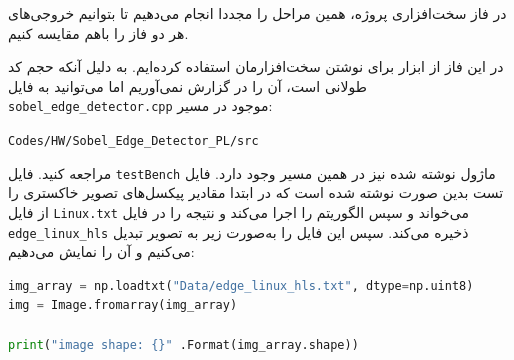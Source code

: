 \begin{qsolve}
	در فاز سخت‌افزاری پروژه، همین مراحل را مجددا انجام می‌دهیم تا بتوانیم خروجی‌های هر دو فاز را باهم مقایسه کنیم. 
	
	در این فاز از ابزار  برای نوشتن سخت‌افزارمان استفاده کرده‌ایم. به دلیل آنکه حجم کد طولانی است، آن را در گزارش نمی‌آوریم اما می‌توانید به فایل \texttt{sobel\_edge\_detector.cpp} موجود در مسیر:
	
	\begin{latin}
		\texttt{Codes/HW/Sobel\_Edge\_Detector\_PL/src}
	\end{latin}
	
	مراجعه کنید. فایل \texttt{testBench} ماژول نوشته شده نیز در همین مسیر وجود دارد. فایل تست بدین صورت نوشته شده است که در ابتدا مقادیر پیکسل‌های تصویر خاکستری را از فایل \texttt{Linux.txt} می‌خواند و سپس الگوریتم را اجرا می‌کند و نتیجه را در فایل \texttt{edge\_linux\_hls} ذخیره می‌کند. سپس این فایل را به‌صورت زیر به تصویر تبدیل می‌کنیم و آن را نمایش می‌دهیم:
\end{qsolve}


\begin{latin}
\begin{lstlisting}[language=Python,caption={SW Edge Detector}]
img_array = np.loadtxt("Data/edge_linux_hls.txt", dtype=np.uint8)
img = Image.fromarray(img_array)

print("image shape: {}" .Format(img_array.shape))
\end{lstlisting}
\end{latin}


